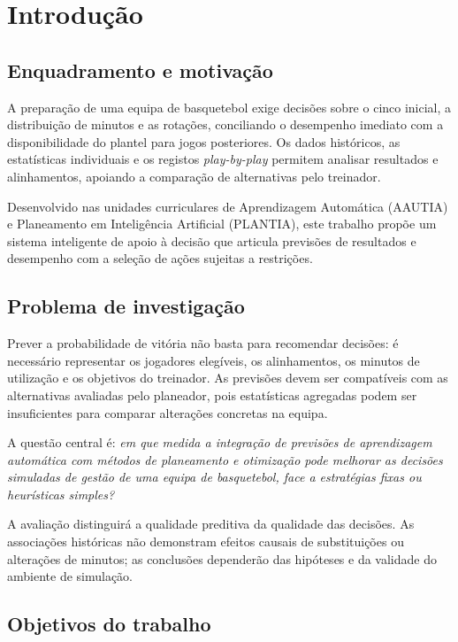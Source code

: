 \chapter{Introdução}
\label{chap:introducao}

\section{Enquadramento e motivação}

A preparação de uma equipa de basquetebol exige decisões sobre o cinco
inicial, a distribuição de minutos e as rotações, conciliando o desempenho
imediato com a disponibilidade do plantel para jogos posteriores. Os dados
históricos, as estatísticas individuais e os registos \emph{play-by-play}
permitem analisar resultados e alinhamentos, apoiando a comparação de
alternativas pelo treinador.

Desenvolvido nas unidades curriculares de Aprendizagem Automática (AAUTIA)
e Planeamento em Inteligência Artificial (PLANTIA), este trabalho propõe
um sistema inteligente de apoio à decisão que articula previsões de
resultados e desempenho com a seleção de ações sujeitas a restrições.

\section{Problema de investigação}

Prever a probabilidade de vitória não basta para recomendar decisões:
é necessário representar os jogadores elegíveis, os alinhamentos, os
minutos de utilização e os objetivos do treinador. As previsões devem
ser compatíveis com as alternativas avaliadas pelo planeador, pois
estatísticas agregadas podem ser insuficientes para comparar alterações
concretas na equipa.

A questão central é: \emph{em que medida a integração de previsões de
aprendizagem automática com métodos de planeamento e otimização pode
melhorar as decisões simuladas de gestão de uma equipa de basquetebol,
face a estratégias fixas ou heurísticas simples?}

A avaliação distinguirá a qualidade preditiva da qualidade das decisões.
As associações históricas não demonstram efeitos causais de substituições
ou alterações de minutos; as conclusões dependerão das hipóteses e da
validade do ambiente de simulação.

\section{Objetivos do trabalho}


